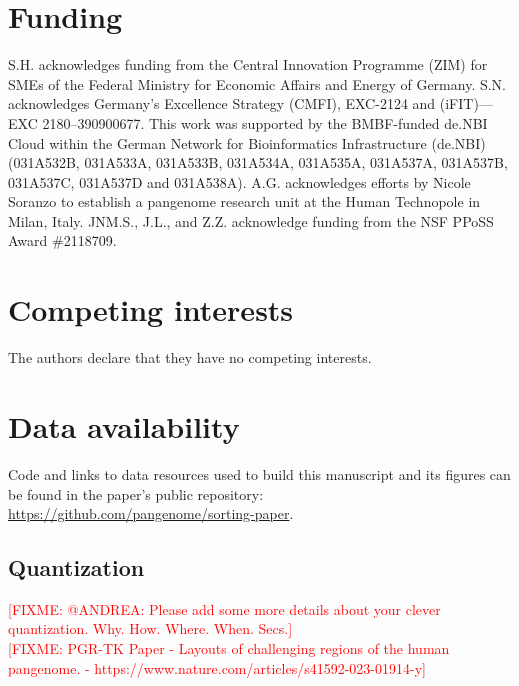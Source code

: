 \documentclass{bioinfo}
\theoremstyle{definition}
\newcommand{\red}[1]{{\textcolor{Red}{#1}}}
\newcommand{\FIXME}[1]{\red{[FIXME: #1]}}
\begin{document}
    \section*{Funding}

    S.H. acknowledges funding from the Central Innovation Programme (ZIM) for SMEs of the Federal Ministry for Economic Affairs and Energy of Germany.
    S.N. acknowledges Germany’s Excellence Strategy (CMFI), EXC-2124 and (iFIT)—EXC 2180–390900677.
    This work was supported by the BMBF-funded de.NBI Cloud within the German Network for Bioinformatics Infrastructure (de.NBI) (031A532B, 031A533A, 031A533B, 031A534A, 031A535A, 031A537A, 031A537B, 031A537C, 031A537D and 031A538A).
    A.G. acknowledges efforts by Nicole Soranzo to establish a pangenome research unit at the Human Technopole in Milan, Italy.
    JNM.S., J.L., and Z.Z. acknowledge funding from the NSF PPoSS Award \#2118709.

    \section*{Competing interests}
    The authors declare that they have no competing interests.

    \section*{Data availability}

    Code and links to data resources used to build this manuscript and its figures can be found in the paper's public repository: \url{https://github.com/pangenome/sorting-paper}.

    

    

    \begin{appendices}
        \section{Quantization}
        \FIXME{@ANDREA: Please add some more details about your clever quantization. Why. How. Where. When. Secs.} \\
        \FIXME{PGR-TK Paper - Layouts of challenging regions of the human pangenome. - https://www.nature.com/articles/s41592-023-01914-y}
    \end{appendices}
\end{document}
